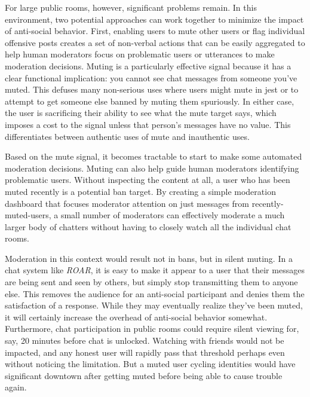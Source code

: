 For large public rooms, however, significant problems remain. In this environment, two potential approaches can work together to minimize the impact of anti-social behavior. First, enabling users to mute other users or flag individual offensive posts creates a set of non-verbal actions that can be easily aggregated to help human moderators focus on problematic users or utterances to make moderation decisions. Muting is a particularly effective signal because it has a clear functional implication: you cannot see chat messages from someone you've muted. This defuses many non-serious uses where users might mute in jest or to attempt to get someone else banned by muting them spuriously. In either case, the user is sacrificing their ability to see what the mute target says, which imposes a cost to the signal unless that person's messages have no value. This differentiates between authentic uses of mute and inauthentic uses.

Based on the mute signal, it becomes tractable to start to make some automated moderation decisions. Muting can also help guide human moderators identifying problematic users. Without inspecting the content at all, a user who has been muted recently is a potential ban target. By creating a simple moderation dashboard that focuses moderator attention on just messages from recently-muted-users, a small number of moderators can effectively moderate a much larger body of chatters without having to closely watch all the individual chat rooms.

Moderation in this context would result not in bans, but in silent muting. In a chat system like \emph{ROAR}, it is easy to make it appear to a user that their messages are being sent and seen by others, but simply stop transmitting them to anyone else. This removes the audience for an anti-social participant and denies them the satisfaction of a response. While they may eventually realize they've been muted, it will certainly increase the overhead of anti-social behavior somewhat. Furthermore, chat participation in public rooms could require silent viewing for, say, 20 minutes before chat is unlocked. Watching with friends would not be impacted, and any honest user will rapidly pass that threshold perhaps even without noticing the limitation. But a muted user cycling identities would have significant downtown after getting muted before being able to cause trouble again.




